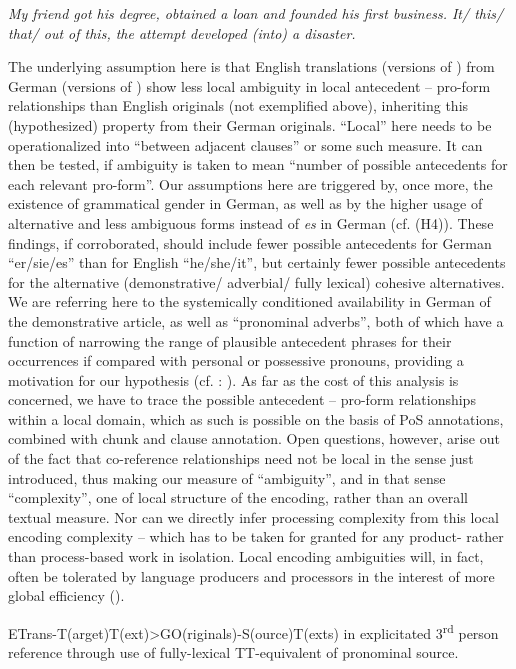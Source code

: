 \documentclass[output=paper]{LSP/langsci}
\begin{document}
\begin{exe}
\begin{exe}
\ea\label{ex:steiner:4}
\textit{My friend got his degree, obtained a loan and founded his first business. It/ this/ that/ out of this, the attempt developed (into) a disaster.} 
\z

The underlying assumption here is that English translations (versions of ) from German (versions of ) show less local ambiguity in local antecedent -- pro-form relationships than English originals (not exemplified above), inheriting this (hypothesized) property from their German originals. ``Local'' here needs to be operationalized into ``between adjacent clauses'' or some such measure. It can then be tested, if ambiguity is taken to mean ``number of possible antecedents for each relevant pro-form''. Our assumptions here are triggered by, once more, the existence of grammatical gender in German, as well as by the higher usage of alternative and less ambiguous forms instead of \textit{es} in German (cf. {(H4)}). These findings, if corroborated, should include fewer possible antecedents for German ``er/sie/es'' than for English ``he/she/it'', but certainly fewer possible antecedents for the alternative (demonstrative/ adverbial/ fully lexical) cohesive alternatives. We are referring here to the systemically conditioned availability in German of the demonstrative article, as well as ``pronominal adverbs'', both of which have a function of narrowing the range of plausible antecedent phrases for their occurrences if compared with personal or possessive pronouns, providing a motivation for our hypothesis (cf. \citealt{Kunzfc}: ). As far as the cost of this analysis is concerned, we have to trace the possible antecedent -- pro-form relationships within a local domain, which as such is possible on the basis of PoS annotations, combined with chunk and clause annotation. Open questions, however, arise out of the fact that co-reference relationships need not be local in the sense just introduced, thus making our measure of ``ambiguity'', and in that sense ``complexity'', one of local structure of the encoding, rather than an overall textual measure. Nor can we directly infer processing complexity from this local encoding complexity -- which has to be taken for granted for any product- rather than process-based work in isolation. Local encoding ambiguities will, in fact, often be tolerated by language producers and processors in the interest of more global efficiency (\citealt[47f]{Hawkins2004}).

\begin{exe}\label{hyp:steiner:3}
ETrans-T(arget)T(ext){\textgreater}GO(riginals)-S(ource)T(exts) in explicitated 3\textsuperscript{rd} person reference through use of fully-lexical TT-equivalent of pronominal source.
\z



\end{exe}
\end{exe}
\end{exe}
\end{document}
